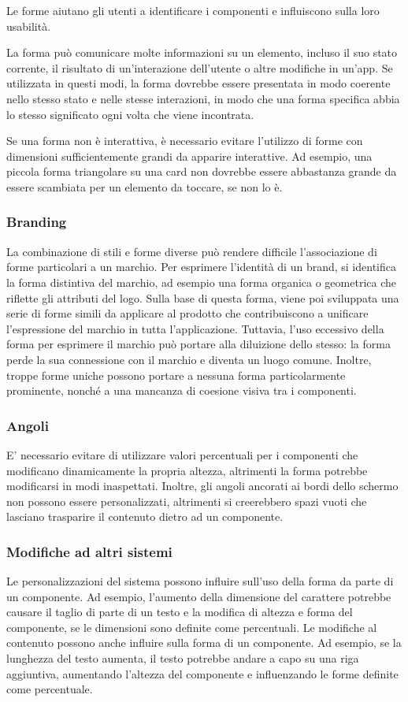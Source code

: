 \documentclass[12pt, a4paper]{report}
\begin{document}
	Le forme aiutano gli utenti a identificare i componenti e influiscono sulla loro usabilità.

	La forma può comunicare molte informazioni su un elemento, incluso il suo stato corrente, il risultato di un'interazione dell'utente o altre modifiche in un'app. Se utilizzata in questi modi, la forma dovrebbe essere presentata in modo coerente
	nello stesso stato e nelle stesse interazioni, in modo che una forma specifica abbia lo stesso significato ogni volta che viene incontrata.

	Se una forma non è interattiva, è necessario evitare l'utilizzo di forme con dimensioni sufficientemente grandi da apparire interattive. Ad esempio, una piccola forma triangolare su una card non dovrebbe essere abbastanza grande da essere scambiata per un elemento da toccare, se non lo è.

	\subsubsection{Branding}
	La combinazione di stili e forme diverse può rendere difficile l'associazione di forme particolari a un marchio. Per esprimere l'identità di un brand, si identifica la forma distintiva del marchio, ad esempio una forma organica o geometrica che riflette
	gli attributi del logo. Sulla base di questa forma,  viene poi sviluppata una serie di forme simili da applicare al prodotto che contribuiscono a unificare l'espressione del marchio in tutta l'applicazione. Tuttavia, l'uso eccessivo della forma per esprimere il marchio può portare
	alla diluizione dello stesso: la forma perde la sua connessione con il marchio e diventa un luogo comune. Inoltre, troppe forme uniche possono portare a nessuna forma particolarmente prominente, nonché a una mancanza di coesione visiva tra i componenti.

	\subsubsection{Angoli}
	E' necessario evitare di utilizzare valori percentuali per i componenti che modificano dinamicamente la propria altezza, altrimenti la forma potrebbe modificarsi in modi inaspettati.
	Inoltre, gli angoli ancorati ai bordi dello schermo non possono essere personalizzati, altrimenti si creerebbero spazi vuoti che lasciano trasparire il contenuto dietro ad un componente.

	\subsubsection{Modifiche ad altri sistemi}
	Le personalizzazioni del sistema possono influire sull'uso della forma da parte di un componente. Ad esempio, l'aumento della dimensione del carattere potrebbe causare il taglio di parte di un testo e la modifica di altezza e forma del componente, se le dimensioni sono definite come percentuali.
	Le modifiche al contenuto possono anche influire sulla forma di un componente. Ad esempio, se la lunghezza del testo aumenta, il testo potrebbe andare a capo su una riga aggiuntiva, aumentando l'altezza del componente e influenzando le forme definite come percentuale.
\end{document}
